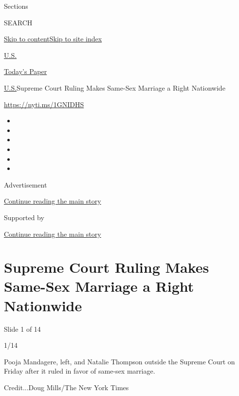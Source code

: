 Sections

SEARCH

\protect\hyperlink{site-content}{Skip to
content}\protect\hyperlink{site-index}{Skip to site index}

\href{https://www.nytimes.com/section/us}{U.S.}

\href{https://myaccount.nytimes.com/auth/login?response_type=cookie\&client_id=vi}{}

\href{https://www.nytimes.com/section/todayspaper}{Today's Paper}

\href{/section/us}{U.S.}\textbar{}Supreme Court Ruling Makes Same-Sex
Marriage a Right Nationwide

\url{https://nyti.ms/1GNIDHS}

\begin{itemize}
\item
\item
\item
\item
\item
\item
\end{itemize}

Advertisement

\protect\hyperlink{after-top}{Continue reading the main story}

Supported by

\protect\hyperlink{after-sponsor}{Continue reading the main story}

\hypertarget{supreme-court-ruling-makes-same-sex-marriage-a-right-nationwide}{%
\section{Supreme Court Ruling Makes Same-Sex Marriage a Right
Nationwide}\label{supreme-court-ruling-makes-same-sex-marriage-a-right-nationwide}}

Slide 1 of 14

1/14

Pooja Mandagere, left, and Natalie Thompson outside the Supreme Court on
Friday after it ruled in favor of same-sex marriage.

Credit...Doug Mills/The New York Times

